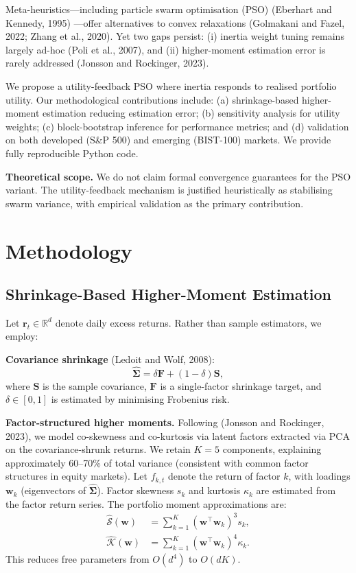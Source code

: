 \documentclass[12pt,a4paper]{article}
\begin{document}
	Meta-heuristics---including particle swarm optimisation (PSO) (Eberhart and Kennedy, 1995) ---offer alternatives to convex relaxations (Golmakani and Fazel, 2022; Zhang et al., 2020). Yet two gaps persist: (i) inertia weight tuning remains largely ad-hoc (Poli et al., 2007), and (ii) higher-moment estimation error is rarely addressed (Jonsson and Rockinger, 2023).
	
	We propose a utility-feedback PSO where inertia responds to realised portfolio utility. Our methodological contributions include: (a) shrinkage-based higher-moment estimation reducing estimation error; (b) sensitivity analysis for utility weights; (c) block-bootstrap inference for performance metrics; and (d) validation on both developed (S\&P 500) and emerging (BIST-100) markets. We provide fully reproducible Python code.
	
	\textbf{Theoretical scope.} We do not claim formal convergence guarantees for the PSO variant. The utility-feedback mechanism is justified heuristically as stabilising swarm variance, with empirical validation as the primary contribution.
	
	\section{Methodology}
	
	\subsection{Shrinkage-Based Higher-Moment Estimation}
	
	Let $\mathbf{r}_t\in\mathbb{R}^d$ denote daily excess returns. Rather than sample estimators, we employ:
	
	\textbf{Covariance shrinkage} (Ledoit and Wolf, 2008):
	\begin{equation}
	\hat{\boldsymbol{\Sigma}} = \delta \mathbf{F} + (1-\delta)\mathbf{S},
	\end{equation}
	where $\mathbf{S}$ is the sample covariance, $\mathbf{F}$ is a single-factor shrinkage target, and $\delta\in[0,1]$ is estimated by minimising Frobenius risk.
	
	\textbf{Factor-structured higher moments.} Following (Jonsson and Rockinger, 2023), we model co-skewness and co-kurtosis via latent factors extracted via PCA on the covariance-shrunk returns. We retain $K=5$ components, explaining approximately 60--70\% of total variance (consistent with common factor structures in equity markets). Let $f_{k,t}$ denote the return of factor $k$, with loadings $\mathbf{w}_k$ (eigenvectors of $\hat{\boldsymbol{\Sigma}}$). Factor skewness $s_k$ and kurtosis $\kappa_k$ are estimated from the factor return series. The portfolio moment approximations are:
	\begin{align}
	\hat{\mathcal{S}}(\mathbf{w}) &= \sum_{k=1}^K (\mathbf{w}^\top\mathbf{w}_k)^3 s_k,\\
	\hat{\mathcal{K}}(\mathbf{w}) &= \sum_{k=1}^K (\mathbf{w}^\top\mathbf{w}_k)^4 \kappa_k.
	\end{align}
	This reduces free parameters from $O(d^4)$ to $O(dK)$.
	
\end{document}

